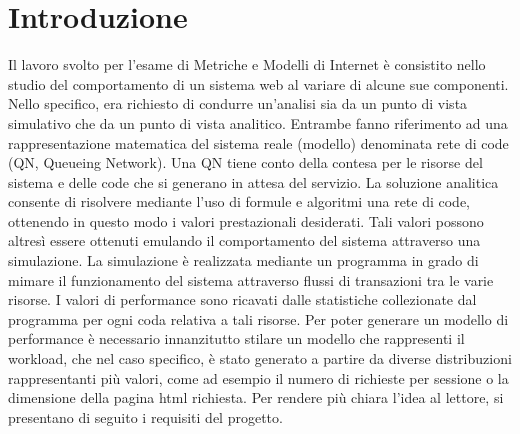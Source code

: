 \chapter{Introduzione}
Il lavoro svolto per l'esame di Metriche e Modelli di Internet è consistito nello studio del comportamento di un sistema web al variare di alcune sue componenti. Nello specifico, era richiesto di condurre un'analisi sia da un punto di vista simulativo che da un punto di vista analitico. Entrambe fanno riferimento ad una 
rappresentazione matematica del sistema reale (modello) denominata rete di code (QN, Queueing Network). Una QN tiene conto della contesa per le risorse del sistema e delle code che si generano in attesa del servizio. 
La soluzione analitica consente di risolvere mediante l’uso di formule e algoritmi una rete di code, ottenendo in questo modo i valori prestazionali desiderati. Tali valori possono altresì essere ottenuti emulando il comportamento del sistema attraverso una simulazione. 
La simulazione è realizzata mediante un programma in grado di mimare il funzionamento del sistema attraverso flussi di transazioni tra le varie risorse. I valori di performance sono ricavati dalle statistiche collezionate dal programma per ogni coda relativa a tali risorse. 
Per poter generare un modello di performance è necessario innanzitutto stilare un modello che rappresenti il workload, che nel caso specifico, è stato generato a partire da diverse distribuzioni rappresentanti più valori, come ad esempio il numero di richieste per sessione o la dimensione della pagina html richiesta. 
Per rendere più chiara l'idea al lettore, si presentano di seguito i requisiti del progetto.
